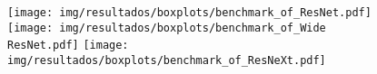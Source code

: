 \begin{figure}[h!]
	\texttt{[image: img/resultados/boxplots/benchmark\_of\_ResNet.pdf]}
	\texttt{[image: img/resultados/boxplots/benchmark\_of\_Wide ResNet.pdf]}
	\texttt{[image: img/resultados/boxplots/benchmark\_of\_ResNeXt.pdf]}
	\caption{}
	\label{fig:Time_of_ResNet based}
\end{figure}
